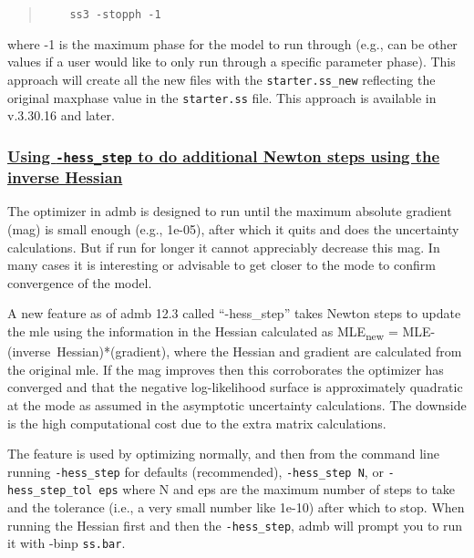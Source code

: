 \begin{quote}
	\begin{verbatim}
	ss3 -stopph -1
	\end{verbatim}
\end{quote}  

where -1 is the maximum phase for the model to run through (e.g., can be other values if a user would like to only run through a specific parameter phase). This approach will create all the new files with the \texttt{starter.ss\_new} reflecting the original maxphase value in the \texttt{starter.ss} file. This approach is available in v.3.30.16 and later.

\hypertarget{hess-step}{}
\subsubsection[Using \texttt{-hess\_step} to do additional Newton steps using the inverse Hessian]{\protect\hyperlink{hess-step}{Using \texttt{-hess\_step} to do additional Newton steps using the inverse Hessian}}

The optimizer in \gls{admb} is designed to run until the maximum absolute gradient (mag) is small enough (e.g., 1e-05), after which it quits and does the uncertainty calculations. But if run for longer it cannot appreciably decrease this mag. In many cases it is interesting or advisable to get closer to the mode to confirm convergence of the model. 

A new feature as of \gls{admb} 12.3 called ``-hess\_step'' takes Newton steps to update the \gls{mle} using the information in the Hessian calculated as MLE\textsubscript{new} = MLE-(inverse~Hessian)*(gradient), where the Hessian and gradient are calculated from the original \gls{mle}. If the mag improves then this corroborates the optimizer has converged and that the negative log-likelihood surface is approximately quadratic at the mode as assumed in the asymptotic uncertainty calculations. The downside is the high computational cost due to the extra matrix calculations.

The feature is used by optimizing normally, and then from the command line running \texttt{-hess\_step} for defaults (recommended), \texttt{-hess\_step N}, or \texttt{-hess\_step\_tol eps} where N and eps are the maximum number of steps to take and the tolerance (i.e., a very small number like 1e-10) after which to stop. When running the Hessian first and then the \texttt{-hess\_step}, \gls{admb} will prompt you to run it with -binp \texttt{ss.bar}.


